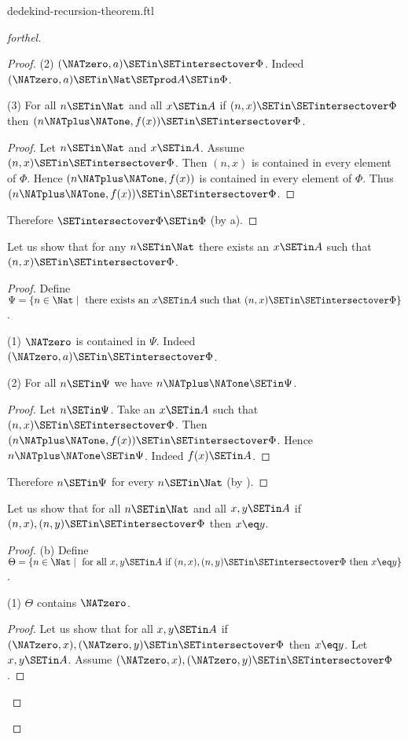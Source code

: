 \documentclass{naproche-library}
\begin{document}
\begin{smodule}[title=Dedekind's Recursion Theorem]{dedekind-recursion-theorem.ftl}
\begin{proof}[forthel]
\begin{proof}
    (2) $(\NATzero, a) \SETin \SETintersectover \Phi$.
    Indeed $(\NATzero, a) \SETin \Nat \SETprod A \SETin \Phi$.

    (3) For all $n \SETin \Nat$ and all $x \SETin A$ if $(n, x) \SETin
    \SETintersectover \Phi$ then $(n \NATplus \NATone, f(x)) \SETin \SETintersectover \Phi$.
    \begin{proof}
      Let $n \SETin \Nat$ and $x \SETin A$.
      Assume $(n, x) \SETin \SETintersectover \Phi$.
      Then $(n, x)$ is contained in every element of $\Phi$.
      Hence $(n \NATplus \NATone, f(x))$ is contained in every element of $\Phi$.
      Thus $(n \NATplus \NATone, f(x)) \SETin \SETintersectover \Phi$.
    \end{proof}

    Therefore $\SETintersectover \Phi \SETin \Phi$ (by a).
  \end{proof}

  Let us show that for any $n \SETin \Nat$ there exists an $x \SETin A$ such
  that $(n, x) \SETin \SETintersectover \Phi$.
  \begin{proof}
    Define $\Psi = \{ n \in \Nat \mid \text{ there exists an }x \SETin A\text{ such
    that }(n, x) \SETin \SETintersectover \Phi \}$.

    (1) $\NATzero$ is contained in $\Psi$.
    Indeed $(\NATzero, a) \SETin \SETintersectover \Phi$.

    (2) For all $n \SETin \Psi$ we have $n \NATplus \NATone \SETin \Psi$.
    \begin{proof}
      Let $n \SETin \Psi$.
      Take an $x \SETin A$ such that $(n, x) \SETin \SETintersectover \Phi$.
      Then $(n \NATplus \NATone, f(x)) \SETin \SETintersectover \Phi$.
      Hence $n \NATplus \NATone \SETin \Psi$.
      Indeed $f(x) \SETin A$.
    \end{proof}

    Therefore $n \SETin \Psi$ for every $n \SETin \Nat$ (by ).
  \end{proof}

  Let us show that for all $n \SETin \Nat$ and all $x, y \SETin A$ if
  $(n, x), (n, y) \SETin \SETintersectover \Phi$ then $x \eq y$.
  \begin{proof}
    (b) Define $\Theta = \{ n \in \Nat \mid \text{ for all }x, y \SETin A\text{ if }
    (n, x), (n, y) \SETin \SETintersectover \Phi\text{ then }x \eq y \}$.

    (1) $\Theta$ contains $\NATzero$.
    \begin{proof}
      Let us show that for all $x, y \SETin A$ if $(\NATzero, x), (\NATzero, y) \SETin
      \SETintersectover \Phi$ then $x \eq y$.
        Let $x, y \SETin A$.
        Assume $(\NATzero, x), (\NATzero, y) \SETin \SETintersectover \Phi$.


\end{proof}
\end{proof}
\end{proof}
\end{smodule}
\end{document}
